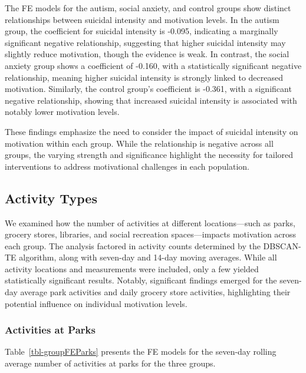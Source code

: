 \documentclass[
  letterpaper,
  number,
  review,
  3p]{elsarticle}
\begin{document}
The FE models for the autism, social anxiety, and control groups show
distinct relationships between suicidal intensity and motivation levels.
In the autism group, the coefficient for suicidal intensity is -0.095,
indicating a marginally significant negative relationship, suggesting
that higher suicidal intensity may slightly reduce motivation, though
the evidence is weak. In contrast, the social anxiety group shows a
coefficient of -0.160, with a statistically significant negative
relationship, meaning higher suicidal intensity is strongly linked to
decreased motivation. Similarly, the control group's coefficient is
-0.361, with a significant negative relationship, showing that increased
suicidal intensity is associated with notably lower motivation levels.

These findings emphasize the need to consider the impact of suicidal
intensity on motivation within each group. While the relationship is
negative across all groups, the varying strength and significance
highlight the necessity for tailored interventions to address
motivational challenges in each population.

\subsection{Activity Types}\label{activity-types}

We examined how the number of activities at different locations---such
as parks, grocery stores, libraries, and social recreation
spaces---impacts motivation across each group. The analysis factored in
activity counts determined by the DBSCAN-TE algorithm, along with
seven-day and 14-day moving averages. While all activity locations and
measurements were included, only a few yielded statistically significant
results. Notably, significant findings emerged for the seven-day average
park activities and daily grocery store activities, highlighting their
potential influence on individual motivation levels.

\subsubsection{Activities at Parks}\label{activities-at-parks}

Table~\ref{tbl-groupFEParks} presents the FE models for the seven-day
rolling average number of activities at parks for the three groups.
\end{document}
